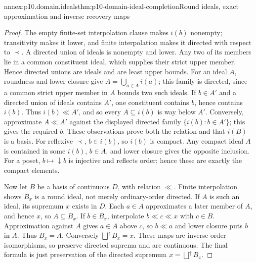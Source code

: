 \begin{annexitem}{annex:p10.domain.ideals}{thm:p10-domain-ideal-completion}{Round ideals, exact approximation and inverse recovery maps}
\begin{proof}
The empty finite-set interpolation clause makes \(i(b)\) nonempty;
transitivity makes it lower, and finite interpolation makes it directed
with respect to \(\prec\). A directed union of ideals is nonempty and
lower. Any two of its members lie in a common constituent ideal,
which supplies their strict upper member. Hence directed unions are
ideals and are least upper bounds.
For an ideal \(A\), roundness and lower closure give
\(A=\bigcup_{a\in A}i(a)\); this family is directed, since a
common strict upper member in \(A\) bounds two such ideals.
If \(b\in A'\) and a directed union of ideals contains \(A'\),
one constituent contains \(b\), hence contains \(i(b)\).
Thus \(i(b)\ll A'\), and so every \(A\subseteq i(b)\) is
way below \(A'\). Conversely, approximate \(A\ll A'\) against
the displayed directed family \(\{i(b):b\in A'\}\); this gives
the required \(b\). These observations prove both the relation and
that \(i(B)\) is a basis.
For reflexive \(\prec\), \(b\in i(b)\), so \(i(b)\) is
compact. Any compact ideal \(A\) is contained in some \(i(b)\),
\(b\in A\), and lower closure gives the opposite inclusion.
For a poset, \(b\mapsto\downarrow b\) is injective and reflects
order; hence these are exactly the compact elements.

Now let \(B\) be a basis of continuous \(D\), with relation \(\ll\).
Finite interpolation shows \(B_x\) is a round ideal, not merely
ordinary-order directed. If \(A\) is such an ideal, its supremum
\(x\) exists in \(D\). Each \(a\in A\) approximates a later
member of \(A\), and hence \(x\), so \(A\subseteq B_x\).
If \(b\in B_x\), interpolate \(b\ll c\ll x\) with \(c\in B\).
Approximation against \(A\) gives \(a\in A\) above \(c\),
so \(b\ll a\) and lower closure puts \(b\) in \(A\).
Thus \(B_x=A\). Conversely \(\bigsqcup^{\uparrow}B_x=x\).
These maps are inverse order isomorphisms, so preserve directed
suprema and are continuous. The final formula is just preservation
of the directed supremum \(x=\bigsqcup^{\uparrow}B_x\).
\end{proof}
\end{annexitem}

